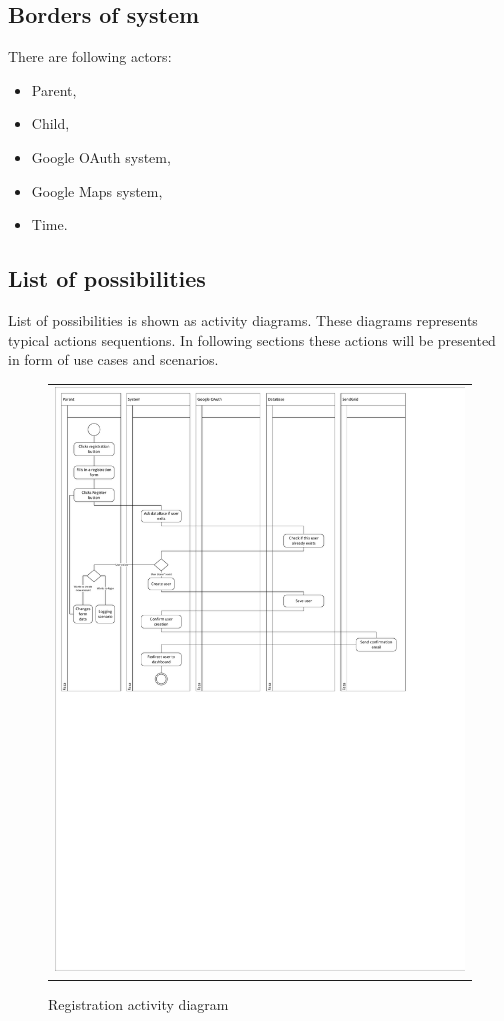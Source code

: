 \documentclass{sprawozdanie-agh}
\begin{document}
		\subsection{Borders of system}

			There are following actors:
			\begin{itemize}
				\item Parent,
				\item Child,
				\item Google OAuth system,
				\item Google Maps system,
				\item Time.
			\end{itemize}

		\subsection{List of possibilities}

			List of possibilities is shown as activity diagrams. These diagrams represents typical actions sequentions. In following sections these actions will be presented in form of use cases and scenarios. 

			\begin{figure}[H]
				\centering
				\begin{tabular}{c}
					\includegraphics[width=.95\textwidth]{cropped_Registration_Activity_Diagram} 
				\end{tabular}
			\caption{Registration activity diagram}
			\end{figure}
\end{document}
